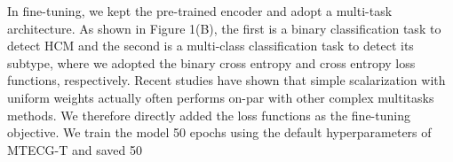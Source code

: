 \documentclass[11pt]{article}
\theoremstyle{definition}
\begin{document}
In fine-tuning, we kept the pre-trained encoder and adopt a multi-task architecture. As shown in Figure 1(B),  the first is a binary classification task to detect HCM and the second is a multi-class classification task to detect its subtype, where we adopted the binary cross entropy and cross entropy loss functions, respectively. Recent studies have shown that simple scalarization with uniform weights actually often performs on-par with other complex multitasks methods. We therefore directly added the loss functions as the fine-tuning objective. We train the model 50 epochs using the default hyperparameters of MTECG-T and saved 50  





















 
 
% 
% 
%
% 
 
\end{document}
